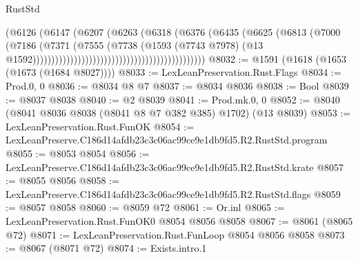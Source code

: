 \begin{lexlean}{RustStd}
\begin{coremodule}
                                                                (@6126
                                                                  (@6147
                                                                    (@6207
                                                                      (@6263
                                                                        (@6318
                                                                          (@6376
                                                                            (@6435
                                                                              (@6625
                                                                                (@6813
                                                                                  (@7000
                                                                                    (@7186
                                                                                      (@7371
                                                                                        (@7555
                                                                                          (@7738
                                                                                            (@1593
                                                                                              (@7743
                                                                                                @7978)
                                                                                              (@13
                                                                                                @1592))))))))))))))))))))))))))))))))))))))))))))))
@8032 := @1591 (@1618 (@1653 (@1673 (@1684 @8027))))
@8033 := LexLeanPreservation.Rust.Flags
@8034 := Prod.{0, 0}
@8036 := @8034 @8 @7
@8037 := @8034 @8036
@8038 := Bool
@8039 := @8037 @8038
@8040 := @2 @8039
@8041 := Prod.mk.{0, 0}
@8052 := @8040 (@8041 @8036 @8038 (@8041 @8 @7 @382 @385) @1702) (@13 @8039)
@8053 := LexLeanPreservation.Rust.FunOK
@8054 := LexLeanPreserve.C186d14afdb23c3c06ac99ce9e1db9fd5.R2.RustStd.program
@8055 := @8053 @8054
@8056 := LexLeanPreserve.C186d14afdb23c3c06ac99ce9e1db9fd5.R2.RustStd.krate
@8057 := @8055 @8056
@8058 := LexLeanPreserve.C186d14afdb23c3c06ac99ce9e1db9fd5.R2.RustStd.flags
@8059 := @8057 @8058
@8060 := @8059 @72
@8061 := Or.inl
@8065 := LexLeanPreservation.Rust.FunOK0 @8054 @8056 @8058
@8067 := @8061 (@8065 @72)
@8071 := LexLeanPreservation.Rust.FunLoop @8054 @8056 @8058
@8073 := @8067 (@8071 @72)
@8074 := Exists.intro.{1}

\end{coremodule}
\end{lexlean}
